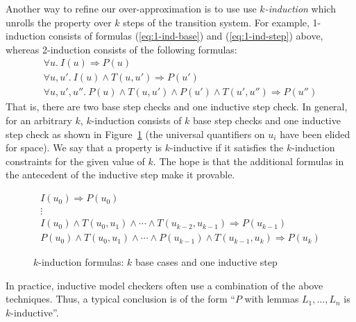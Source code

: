 Another way to refine our over-approximation is to use use {\em
  $k$-induction} which unrolls the property over $k$ steps of the
transition system. For example, 1-induction consists of formulas
(\ref{eq:1-ind-base}) and (\ref{eq:1-ind-step}) above, whereas
2-induction consists of the following formulas:
\begin{gather*}
\forall u.~ I(u) \Rightarrow P(u) \\
\forall u, u'.~ I(u) \land T(u, u') \Rightarrow P(u') \\
\forall u, u', u''.~ P(u) \land T(u, u') \land P(u') \land T(u',
  u'') \Rightarrow P(u'')
\end{gather*}
That is, there are two base step checks and one inductive step check.
In general, for an arbitrary $k$, $k$-induction consists of $k$
base step checks and one inductive step check as shown in
Figure~\ref{fig:k-induction} (the universal quantifiers on $u_i$ have
been elided for space). We say that a property is $k$-inductive if it
satisfies the $k$-induction constraints for the given value of $k$.
The hope is that the additional formulas in the antecedent of the
inductive step make it provable.

\begin{figure}
\begin{gather*}
I(u_0) \Rightarrow P(u_0) \\[-2pt]
%
\vdots \\[2pt]
%
I(u_0) \land T(u_0, u_1) \land \cdots \land T(u_{k-2}, u_{k-1})
\Rightarrow P(u_{k-1}) \\[2pt]
%
P(u_0) \land T(u_0, u_1) \land \cdots \land P(u_{k-1}) \land
T(u_{k-1}, u_k) \Rightarrow P(u_k)
\end{gather*}
\caption{$k$-induction formulas: $k$ base cases and one inductive
  step}
\label{fig:k-induction}
\end{figure}

In practice, inductive model checkers often use a combination of the
above techniques. Thus, a typical conclusion is of the form ``$P$ with
lemmas $L_1, \ldots, L_n$ is $k$-inductive''.



